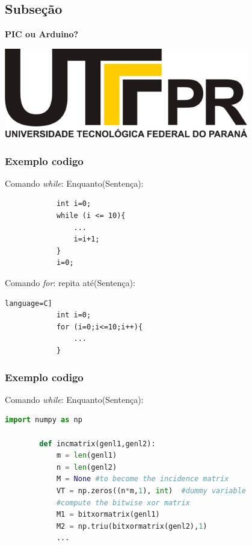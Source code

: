 \documentclass[t]{beamer}
\begin{document}
\subsection{Subseção}
\begin{frame}[c]


\end{frame}
\begin{frame}[c]
	\textbf{PIC ou Arduino?}
	\newline

	\begin{center}
		\includegraphics[width=0.8\textwidth]{images/logo.jpg}
	\end{center}
\end{frame}

\begin{frame}[fragile]
	\frametitle{Exemplo codigo}
		Comando \textit{while}: Enquanto(Sentença):
		\begin{lstlisting}
			int i=0;
			while (i <= 10){
				...
				i=i+1;
			}
			i=0;
		\end{lstlisting}
			Comando \textit{for}: repita até(Sentença):
		\begin{lstlisting}language=C]
			int i=0;
			for (i=0;i<=10;i++){
				...
			}
		\end{lstlisting}
\end{frame}

\begin{frame}[fragile]
	\frametitle{Exemplo codigo}
	Comando \textit{while}: Enquanto(Sentença):

	\begin{lstlisting}[language=Python]
		import numpy as np
		
		def incmatrix(genl1,genl2):
			m = len(genl1)
			n = len(genl2)
			M = None #to become the incidence matrix
			VT = np.zeros((n*m,1), int)  #dummy variable
			#compute the bitwise xor matrix
			M1 = bitxormatrix(genl1)
			M2 = np.triu(bitxormatrix(genl2),1) 
			... 
	\end{lstlisting}
\end{frame}
\end{document}
